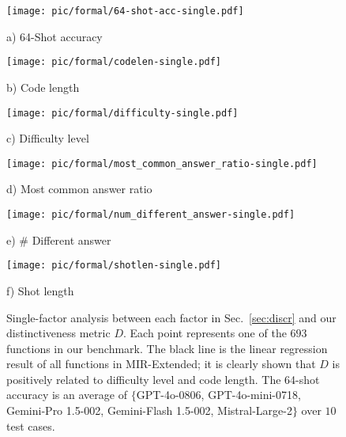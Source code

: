 \begin{figure}[ht]
    \centering
    \begin{minipage}[t]{0.48\textwidth}
        \centering
        \texttt{[image: pic/formal/64-shot-acc-single.pdf]}
        \caption*{a) 64-Shot accuracy}
    \end{minipage}
    \hfill
    \begin{minipage}[t]{0.48\textwidth}
        \centering
        \texttt{[image: pic/formal/codelen-single.pdf]}
        \caption*{b) Code length}
    \end{minipage}
    
    
    \begin{minipage}[t]{0.48\textwidth}
        \centering
        \texttt{[image: pic/formal/difficulty-single.pdf]}
        \caption*{c) Difficulty level}
    \end{minipage}
    \hfill
    \begin{minipage}[t]{0.48\textwidth}
        \centering
        \texttt{[image: pic/formal/most\_common\_answer\_ratio-single.pdf]}
        \caption*{d) Most common answer ratio}
    \end{minipage}
    
    
    \begin{minipage}[t]{0.48\textwidth}
        \centering
        \texttt{[image: pic/formal/num\_different\_answer-single.pdf]}
        \caption*{e) \# Different answer}
    \end{minipage}
    \hfill
    \begin{minipage}[t]{0.48\textwidth}
        \centering
        \texttt{[image: pic/formal/shotlen-single.pdf]}
        \caption*{f) Shot length}
    \end{minipage}
    
    \caption{Single-factor analysis between each factor in Sec.~\ref{sec:discr} and our distinctiveness metric $D$. Each point represents one of the $693$ functions in our benchmark. The black line is the linear regression result of all functions in MIR-Extended; it is clearly shown that $D$ is positively related to difficulty level and code length. The 64-shot accuracy is an average of $\{$GPT-4o-0806, GPT-4o-mini-0718, Gemini-Pro 1.5-002, Gemini-Flash 1.5-002, Mistral-Large-2$\}$ over $10$ test cases.}
    \label{fig:fig_single_factor}
\end{figure}


